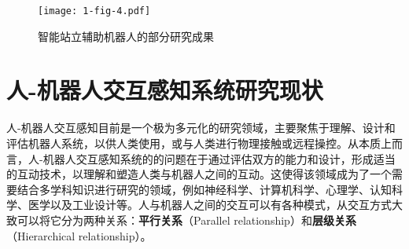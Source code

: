 \begin{figure}[h]
  \centering
  \texttt{[image: 1-fig-4.pdf]}
  \caption{智能站立辅助机器人的部分研究成果}
  \label{fig:1-4}
\end{figure}

\section{人-机器人交互感知系统研究现状}
人-机器人交互感知目前是一个极为多元化的研究领域，主要聚焦于理解、设计和评估机器人系统，以供人类使用，或与人类进行物理接触或远程操控。从本质上而言，人-机器人交互感知系统的的问题在于通过评估双方的能力和设计，形成适当的互动技术，以理解和塑造人类与机器人之间的互动。这使得该领域成为了一个需要结合多学科知识进行研究的领域，例如神经科学、计算机科学、心理学、认知科学、医学以及工业设计等\cite{mohebbiHumanRobotInteractionRehabilitation2020a}。人与机器人之间的交互可以有各种模式，从交互方式大致可以将它分为两种关系：\textbf{平行关系}（Parallel relationship）和\textbf{层级关系}（Hierarchical relationship）\cite{liuDesigningRobotBehavior}。
